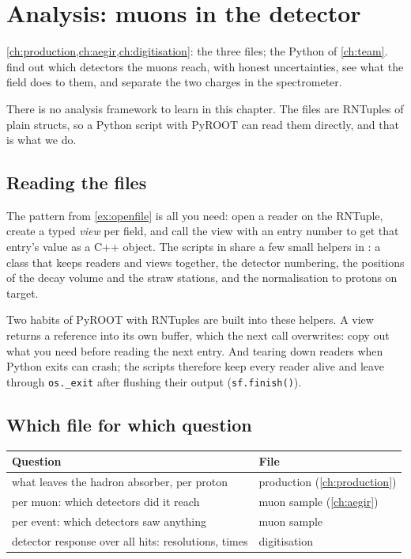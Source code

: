 \chapter{Analysis: muons in the detector}
\label{ch:analysis}

{\cref{ch:production,ch:aegir,ch:digitisation}: the three files; the Python of
\cref{ch:team}.}
{find out which detectors the muons reach, with honest uncertainties, see
what the field does to them, and separate the two charges in the
spectrometer.}

There is no analysis framework to learn in this chapter. The files are
RNTuples of plain structs, so a Python script with PyROOT can read them
directly, and that is what we do.

\section{Reading the files}

The pattern from \cref{ex:openfile} is all you need: open a reader on the
RNTuple, create a typed \emph{view} per field, and call the view with an entry
number to get that entry's value as a C++ object. The scripts in
 share a few small helpers in : a
class that keeps readers and views together, the detector numbering, the
positions of the decay volume and the straw stations, and the normalisation
to protons on target.


\begin{pitfall}
Two habits of PyROOT with RNTuples are built into these helpers. A view
returns a reference into its own buffer, which the next call overwrites: copy
out what you need before reading the next entry. And tearing down readers
when Python exits can crash; the scripts therefore keep every reader alive and
leave through \texttt{os.\_exit} after flushing their output
(\texttt{sf.finish()}).
\end{pitfall}

\section{Which file for which question}

\begin{center}
\small
\begin{tabularx}{\linewidth}{X l}
\toprule
Question & File \\
\midrule
what leaves the hadron absorber, per proton & production (\cref{ch:production}) \\
per muon: which detectors did it reach & muon sample (\cref{ch:aegir}) \\
per event: which detectors saw anything & muon sample \\
detector response over all hits: resolutions, times & digitisation \\
\bottomrule
\end{tabularx}
\end{center}

